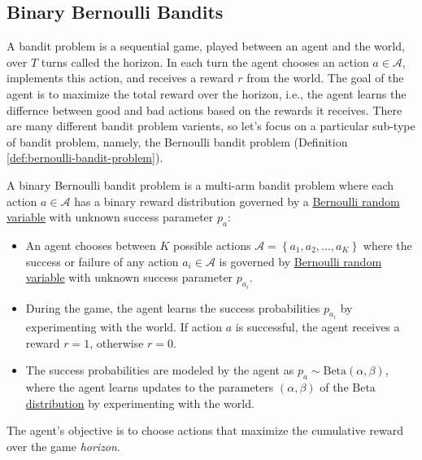\documentclass[11pt]{article}
\theoremstyle{definition}
\begin{document}
\subsection{Binary Bernoulli Bandits}\label{sec:binary-bernoulli-bandits}
A bandit problem is a sequential game, played between an agent and the world, over $T$ turns called the horizon.
In each turn the agent chooses an action $a\in\mathcal{A}$, implements this action, and receives a reward $r$ from the world.
The goal of the agent is to maximize the total reward over the horizon, i.e., the agent learns the differnce between good and bad actions based on the rewards it receives.
There are many different bandit problem varients, so let's focus on a particular sub-type of bandit problem, namely, 
the Bernoulli bandit problem (Definition \ref{def:bernoulli-bandit-problem}).

\begin{definition}\label{def:bernoulli-bandit-problem}
A binary Bernoulli bandit problem is a multi-arm bandit problem where each action $a\in\mathcal{A}$ has a binary reward distribution
governed by a \href{https://en.wikipedia.org/wiki/Bernoulli_distribution}{Bernoulli random variable} with unknown success parameter $p_{a}$:
\begin{itemize}
\item{An agent chooses between $K$ possible actions $\mathcal{A}=\left\{a_{1},a_{2},\dots,a_{K}\right\}$ where the success or failure of any action $a_{i}\in\mathcal{A}$
is governed by \href{https://en.wikipedia.org/wiki/Bernoulli_distribution}{Bernoulli random variable} with unknown success parameter $p_{a_{i}}$.}
\item{During the game, the agent learns the success probabilities $p_{a_{i}}$ by experimenting with the world. If action $a$ is successful, the agent receives a reward $r=1$, otherwise $r=0$.}
\item{The success probabilities are modeled by the agent as $p_{a}\sim\text{Beta}(\alpha,\beta)$, 
where the agent learns updates to the parameters $(\alpha,\beta)$ of the \href{https://en.wikipedia.org/wiki/Beta_distribution}{$\text{Beta}$ distribution}
by experimenting with the world.}
\end{itemize}
The agent's objective is to choose actions that maximize the cumulative reward over the game \textit{horizon}.
\end{definition}
\end{document}
